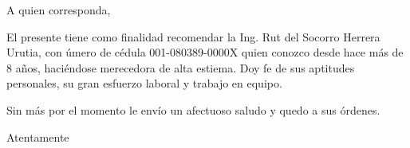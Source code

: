 \documentclass[letterpaper, 12pt]{letter}
\begin{document}
\address{Managua, Nicaragua}
\signature{Samuel José Gutiérrez Avilés \\ 001-050986-0007C}

\begin{letter}{}

\opening{A quien corresponda,}
El presente tiene como finalidad recomendar la Ing. Rut del Socorro Herrera Urutia, con úmero de cédula 001-080389-0000X quien conozco desde hace más de 8 años, haciéndose merecedora de alta estiema. Doy fe de sus aptitudes personales, su gran esfuerzo laboral y trabajo en equipo.

Sin más por el momento le envío un afectuoso saludo y quedo a sus órdenes.

\closing{Atentamente}
\end{letter}
\end{document}
